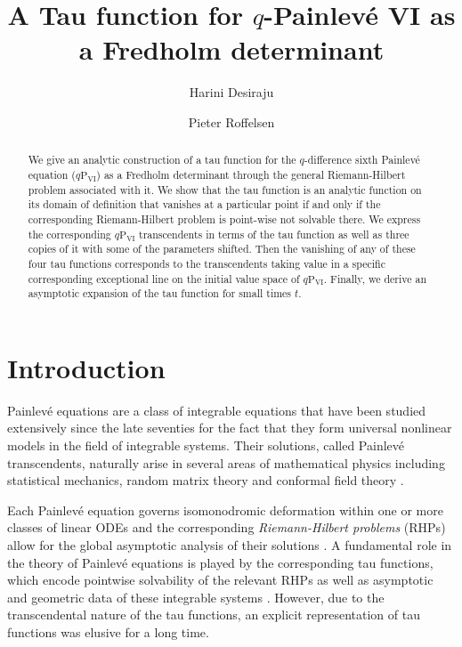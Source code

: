 \documentclass[a4paper,reqno,11pt]{amsart}
\title{A Tau function for $q$-Painlev\'e VI as a Fredholm determinant}
\author{Harini Desiraju}
\author{Pieter Roffelsen}
\date{}
\numberwithin{equation}{section}
\numberwithin{figure}{section}
\theoremstyle{plain}
\theoremstyle{remark}
\newcommand\Psix{\textrm{P}_{\textrm{VI}}}
\numberwithin{rhp}{section}
\begin{document}
\maketitle
\begin{abstract}
We give an analytic construction of a tau function for the $q$-difference sixth Painlev\'e equation ($q\Psix$) as a Fredholm determinant through the general Riemann-Hilbert problem associated with it.
We show that the tau function is an analytic function on its domain of definition that vanishes at a particular point if and only if the corresponding Riemann-Hilbert problem is point-wise not solvable there. We express the corresponding $q\Psix$ transcendents in terms of the tau function as well as three copies of it with some of the parameters shifted. Then the vanishing of any of these four tau functions corresponds to the transcendents taking value in a specific corresponding exceptional line on the initial value space of $q\Psix$. Finally, we derive an asymptotic expansion of the tau function for small times $t$.
\end{abstract}
% 

\section{Introduction}


Painlev\'e equations are a class of integrable equations that have been studied extensively since the late seventies for the fact that they form universal nonlinear models in the field of integrable systems.
Their solutions, called Painlev\'e transcendents, naturally arise in several areas of mathematical physics including statistical mechanics, random matrix theory and conformal field theory \cite{conte2012painleve,iwasaki2013gauss}.

Each Painlev\'e equation governs  isomonodromic deformation within one or more classes of linear ODEs and the corresponding \textit{Riemann-Hilbert problems} (RHPs) allow for the  global asymptotic analysis of their solutions \cite{jimbo1981monodromy,fokasitskapaev}. A fundamental role in the theory of Painlev\'e equations is played by the corresponding tau functions, which encode pointwise solvability of the relevant RHPs as well as asymptotic and geometric data of these integrable systems \cite{jimbo1981monodromy,harnad2021tau}. However, due to the transcendental nature of the tau functions, an explicit representation of tau functions was elusive for a long time.  
\end{document}
